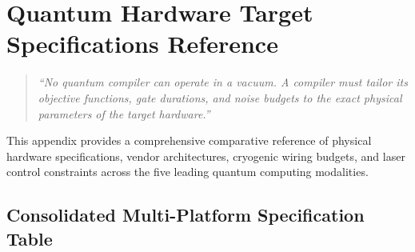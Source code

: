 \chapter{Quantum Hardware Target Specifications Reference}
\label{app:hardware_specs}

\begin{quote}
\textit{``No quantum compiler can operate in a vacuum. A compiler must tailor its objective functions, gate durations, and noise budgets to the exact physical parameters of the target hardware.''}
\end{quote}

This appendix provides a comprehensive comparative reference of physical hardware specifications, vendor architectures, cryogenic wiring budgets, and laser control constraints across the five leading quantum computing modalities.

\section{Consolidated Multi-Platform Specification Table}
\label{sec:app_hardware_table}

